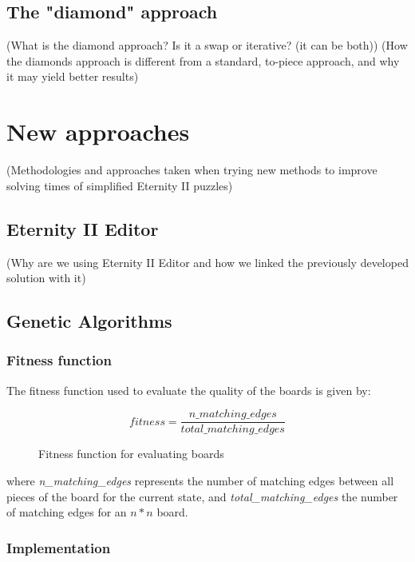 \documentclass{llncs}
\begin{document}
\subsection{The "diamond" approach}

(What is the diamond approach? Is it a swap or iterative? (it can be both))
(How the diamonds approach is different from a standard, to-piece approach, and why it may yield better results)


\section{New approaches}

(Methodologies and approaches taken when trying new methods to improve solving times of simplified Eternity II puzzles)

\subsection{Eternity II Editor}

(Why are we using Eternity II Editor and how we linked the previously developed solution with it)

\subsection{Genetic Algorithms}

\subsubsection{Fitness function}\label{sec:fitness-function}

The fitness function used to evaluate the quality of the boards is given by:

\begin{figure}[h]
	\begin{equation}
		fitness = \frac{n\_matching\_edges}{total\_matching\_edges}
	\end{equation}
	\caption{Fitness function for evaluating boards}
	\label{fig:eq:fitness_function}
\end{figure}

where \textit{n\_matching\_edges} represents the number of matching edges between all pieces of the board for the current state, and \textit{total\_matching\_edges} the number of matching edges for an $n*n$ board.

\subsubsection{Implementation}\label{sec:implementation}
\end{document}
